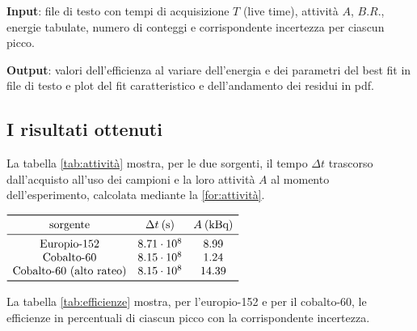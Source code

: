 \documentclass{article}
\begin{document}
            \textbf{Input}: file di testo con tempi di acquisizione $T$ (live time), attività $A$, $B.R.$, energie tabulate, numero di conteggi e corrispondente incertezza per ciascun picco.

            \textbf{Output}: valori dell'efficienza al variare dell'energia e dei parametri del best fit in file di testo e plot del fit caratteristico e dell'andamento dei residui in pdf.

        \subsection*{I risultati ottenuti}
            La tabella \ref{tab:attività} mostra, per le due sorgenti, il tempo $\Delta t$ trascorso dall'acquisto all'uso dei campioni e la loro attività $A$ al momento dell'esperimento, calcolata mediante la \eqref{for:attività}.
                \begin{table}[h!]
                    \centering
                    \caption{attività sorgenti}
                    \label{tab:attività}
                    $
                    \begin{array}{cccccc}
                        \toprule
                        \text{sorgente}       & \Delta t\:\si{(\second)} & A\:\si{(\kilo\becquerel)} \\
                        \midrule
                        \text{Europio-152}&8.71\cdot10^{8}&8.99\\
                        \text{Cobalto-60}&8.15\cdot10^{8}&1.24\\
                        \text{Cobalto-60 (alto rateo)}&8.15\cdot10^{8}&14.39\\
                        \bottomrule
                    \end{array}
                    $
                \end{table}
                
            La tabella \ref{tab:efficienze} mostra, per l'europio-152 e per il cobalto-60, le efficienze in percentuali di ciascun picco con la corrispondente incertezza.
                \begin{table}[h!]
                    \centering
                    \caption{efficienze}
                    \label{tab:efficienze}
                    \subtable[Europio-152]
                        {
                            $
                            
                            $
                        }
                    \subtable[Cobalto-60]
                        {
                            $
                            
                            $
                        }
                \end{table}
\end{document}
